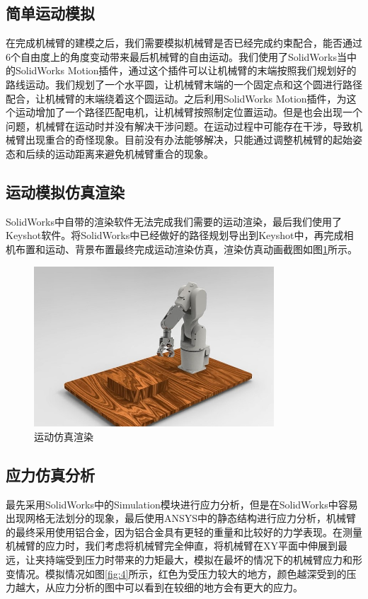 \subsection{简单运动模拟}
在完成机械臂的建模之后，我们需要模拟机械臂是否已经完成约束配合，能否通过6个自由度上的角度变动带来最后机械臂的自由运动。我们使用了SolidWorks当中的SolidWorks Motion插件，通过这个插件可以让机械臂的末端按照我们规划好的路线运动。我们规划了一个水平圆，让机械臂末端的一个固定点和这个圆进行路径配合，让机械臂的末端绕着这个圆运动。之后利用SolidWorks Motion插件，为这个运动增加了一个路径匹配电机，让机械臂按照制定位置运动。但是也会出现一个问题，机械臂在运动时并没有解决干涉问题。在运动过程中可能存在干涉，导致机械臂出现重合的奇怪现象。目前没有办法能够解决，只能通过调整机械臂的起始姿态和后续的运动距离来避免机械臂重合的现象。

\subsection{运动模拟仿真渲染}
SolidWorks中自带的渲染软件无法完成我们需要的运动渲染，最后我们使用了Keyshot软件。将SolidWorks中已经做好的路径规划导出到Keyshot中，再完成相机布置和运动、背景布置最终完成运动渲染仿真，渲染仿真动画截图如图\ref{fig:3}所示。

\begin{figure}[h]
    \centering
    \includegraphics[width=0.8\textwidth]{Image/fig3.jpg}
    \caption{运动仿真渲染}
    \label{fig:3}
\end{figure}

\subsection{应力仿真分析}
最先采用SolidWorks中的Simulation模块进行应力分析，但是在SolidWorks中容易出现网格无法划分的现象，最后使用ANSYS中的静态结构进行应力分析，机械臂的最终采用使用铝合金，因为铝合金具有更轻的重量和比较好的力学表现。在测量机械臂的应力时，我们考虑将机械臂完全伸直，将机械臂在XY平面中伸展到最远，让夹持端受到压力时带来的力矩最大，模拟在最坏的情况下的机械臂应力和形变情况。模拟情况如图\ref{fig:4}所示，红色为受压力较大的地方，颜色越深受到的压力越大，从应力分析的图中可以看到在较细的地方会有更大的应力。

